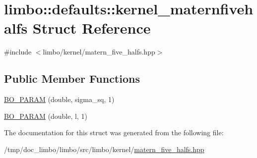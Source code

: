 \hypertarget{structlimbo_1_1defaults_1_1kernel__maternfivehalfs}{}\section{limbo\+:\+:defaults\+:\+:kernel\+\_\+maternfivehalfs Struct Reference}
\label{structlimbo_1_1defaults_1_1kernel__maternfivehalfs}


{\ttfamily \#include $<$limbo/kernel/matern\+\_\+five\+\_\+halfs.\+hpp$>$}

\subsection*{Public Member Functions}
\begin{DoxyCompactItemize}
\item 
\hyperlink{group__kernel__defaults_ga872fb50d6e244a40ff7c65321434b24b}{B\+O\+\_\+\+P\+A\+R\+A\+M} (double, sigma\+\_\+sq, 1)
\item 
\hyperlink{group__kernel__defaults_gaae66735209158acd497dc5034fa535ff}{B\+O\+\_\+\+P\+A\+R\+A\+M} (double, l, 1)
\end{DoxyCompactItemize}


The documentation for this struct was generated from the following file\+:\begin{DoxyCompactItemize}
\item 
/tmp/doc\+\_\+limbo/limbo/src/limbo/kernel/\hyperlink{matern__five__halfs_8hpp}{matern\+\_\+five\+\_\+halfs.\+hpp}\end{DoxyCompactItemize}
